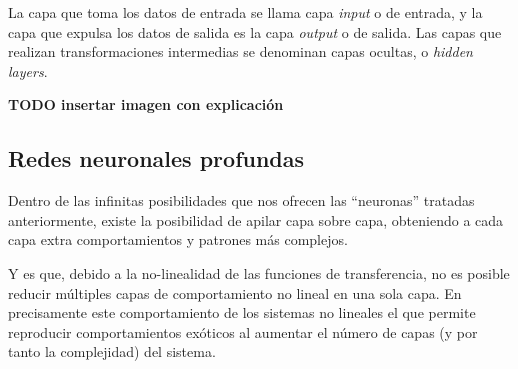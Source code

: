La capa que toma los datos de entrada se llama capa \textit{input} o de entrada, y la capa que expulsa los datos de salida es la capa \textit{output} o de salida. Las capas que realizan transformaciones intermedias se denominan capas ocultas, o \textit{hidden layers}.

\textbf{TODO insertar imagen con explicación}

\subsection{Redes neuronales profundas}
\label{ssec:redes_reuronales_profundas}
Dentro de las infinitas posibilidades que nos ofrecen las ``neuronas'' tratadas anteriormente, existe la posibilidad de apilar capa sobre capa, obteniendo a cada capa extra comportamientos y patrones más complejos.

Y es que, debido a la no-linealidad de las funciones de transferencia, no es posible reducir múltiples capas de comportamiento no lineal en una sola capa. En precisamente este comportamiento de los sistemas no lineales el que permite reproducir comportamientos exóticos al aumentar el número de capas (y por tanto la complejidad) del sistema.